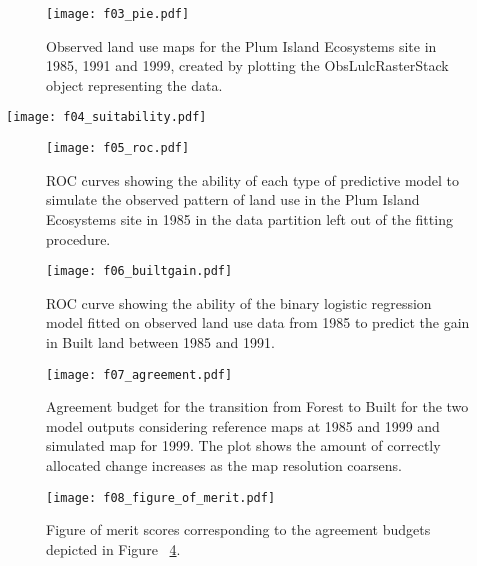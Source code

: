 \documentclass[gmdd, online, hvmath]{copernicus}
\begin{document}
\begin{figure}[h]
  \texttt{[image: f03\_pie.pdf]}
  \caption{Observed land use maps for the Plum Island Ecosystems site in 1985, 1991 and 1999, created by plotting the ObsLulcRasterStack object representing the data.}
  \label{fig:pie}
\end{figure}

\begin{figure*}[t]
  \texttt{[image: f04\_suitability.pdf]}
  \caption{Suitability of pixels in the Plum Island Ecosystems study site to belong to Forest, Built and Other land use classes according to binary logistic regression models. Elevation and slope are used as explanatory variables for all land uses while Built additionally includes distance to built pixels in 1985.}
  \label{fig:suitability}
\end{figure*}

\begin{figure}[t]
  \texttt{[image: f05\_roc.pdf]}
  \caption{ROC curves showing the ability of each type of predictive model to simulate the observed pattern of land use in the Plum Island Ecosystems site in 1985 in the data partition left out of the fitting procedure.}
  \label{fig:roc}
\end{figure}

\begin{figure}[t]
  \texttt{[image: f06\_builtgain.pdf]}
  \caption{ROC curve showing the ability of the binary logistic regression model fitted on observed land use data from 1985 to predict the gain in Built land between 1985 and 1991.}
  \label{fig:builtgain}
\end{figure}

\begin{figure}[t]
  \texttt{[image: f07\_agreement.pdf]}
  \caption{Agreement budget for the transition from Forest to Built for the two model outputs considering reference maps at 1985 and 1999 and simulated map for 1999. The plot shows the amount of correctly allocated change increases as the map resolution coarsens.}
  \label{fig:agreement}
\end{figure}

\begin{figure}[t]
  \texttt{[image: f08\_figure\_of\_merit.pdf]}
  \caption{Figure of merit scores corresponding to the agreement budgets depicted in Figure ~\ref{fig:agreement}.}
  \label{fig:fom}
\end{figure}
\end{document}
